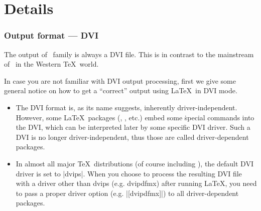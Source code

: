 \documentclass[a4paper,11pt,dvipdfmx]{article}
\begin{document}
\newpage


\part{Details}%

\section{Output format --- DVI}

The output of \pTeX\ family is always a DVI file.
This is in contrast to the mainstream of \pdfTeX\ in the Western \TeX\ world.

In case you are not familiar with DVI output processing,
first we give some general notice on how to get a ``correct'' output
using \LaTeX\ in DVI mode.

\begin{itemize}
  \item The DVI format is, as its name suggests, inherently driver-independent.
    However, some \LaTeX\ packages (, ,  etc.)
    embed some \.{special} commands into the DVI, which can be interpreted later
    by some specific DVI driver.
    Such a DVI is no longer driver-independent, thus those are called
    driver-dependent packages.
  \item In almost all major \TeX\ distributions (of course including \TL),
    the default DVI driver is set to |dvips|.
    When you choose to process the resulting DVI file with a driver
    other than dvips (e.g. dvipdfmx) after running \LaTeX,
    you need to pass a proper driver option (e.g. |[dvipdfmx]|) to
    all driver-dependent packages.
\end{itemize}
\end{document}
